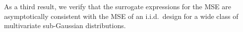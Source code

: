 \documentclass[11pt]{article}
\begin{document}
\noindent


As a third result, we verify that the surrogate expressions for the
MSE are asymptotically consistent with the MSE of an i.i.d.~design
for a wide class of multivariate sub-Gaussian distributions.
\end{document}
